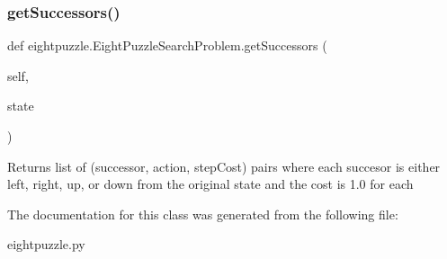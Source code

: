 \subsubsection{\texorpdfstring{get\+Successors()}{getSuccessors()}}
{\footnotesize\ttfamily def eightpuzzle.\+Eight\+Puzzle\+Search\+Problem.\+get\+Successors (\begin{DoxyParamCaption}\item[{}]{self,  }\item[{}]{state }\end{DoxyParamCaption})}

\begin{DoxyVerb}  Returns list of (successor, action, stepCost) pairs where
  each succesor is either left, right, up, or down
  from the original state and the cost is 1.0 for each
\end{DoxyVerb}
 

The documentation for this class was generated from the following file\+:\begin{DoxyCompactItemize}
\item 
eightpuzzle.\+py\end{DoxyCompactItemize}
